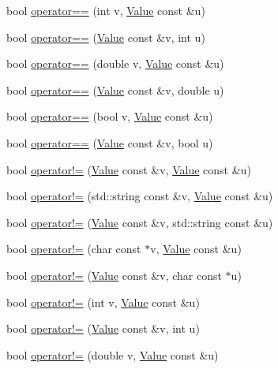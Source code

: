 \begin{DoxyCompactItemize}
\item 
bool \hyperlink{namespacej_ab93da7327e6b1b5562e422a9b8aef13b}{operator==} (int v, \hyperlink{classj_1_1_value}{Value} const \&u)
\item 
bool \hyperlink{namespacej_a9c34353ab8f78d54f7c4baa876b11af6}{operator==} (\hyperlink{classj_1_1_value}{Value} const \&v, int u)
\item 
bool \hyperlink{namespacej_a53b1192780e8f3f05e15b2add5f456cd}{operator==} (double v, \hyperlink{classj_1_1_value}{Value} const \&u)
\item 
bool \hyperlink{namespacej_a60a21e8636a04ce9fa4acc8d88e7542b}{operator==} (\hyperlink{classj_1_1_value}{Value} const \&v, double u)
\item 
bool \hyperlink{namespacej_a9899c72f05714801d108b84d32202fbe}{operator==} (bool v, \hyperlink{classj_1_1_value}{Value} const \&u)
\item 
bool \hyperlink{namespacej_a379b788f7fb42179ba792078bdcd5cea}{operator==} (\hyperlink{classj_1_1_value}{Value} const \&v, bool u)
\item 
bool \hyperlink{namespacej_af5a8747cda1c73c42dff2c9ebfa293e5}{operator!=} (\hyperlink{classj_1_1_value}{Value} const \&v, \hyperlink{classj_1_1_value}{Value} const \&u)
\item 
bool \hyperlink{namespacej_a52c615966aea72ad690cf4baa3cc599b}{operator!=} (std\-::string const \&v, \hyperlink{classj_1_1_value}{Value} const \&u)
\item 
bool \hyperlink{namespacej_a1abe2a8d115e5632c0c61d6ae8432d1c}{operator!=} (\hyperlink{classj_1_1_value}{Value} const \&v, std\-::string const \&u)
\item 
bool \hyperlink{namespacej_a4c878f634f28514e3470fecc5496d173}{operator!=} (char const $\ast$v, \hyperlink{classj_1_1_value}{Value} const \&u)
\item 
bool \hyperlink{namespacej_af4a7f03cb2415b6c379921f65f622e43}{operator!=} (\hyperlink{classj_1_1_value}{Value} const \&v, char const $\ast$u)
\item 
bool \hyperlink{namespacej_aad7eb8dcaa30217e852eef5fe3fadd13}{operator!=} (int v, \hyperlink{classj_1_1_value}{Value} const \&u)
\item 
bool \hyperlink{namespacej_aa7f94b04ff3933fd5b303ead6cc09c9e}{operator!=} (\hyperlink{classj_1_1_value}{Value} const \&v, int u)
\item 
bool \hyperlink{namespacej_a5ed7baccda4a55142f17b5e0dc990526}{operator!=} (double v, \hyperlink{classj_1_1_value}{Value} const \&u)
\item 

\end{DoxyCompactItemize}
